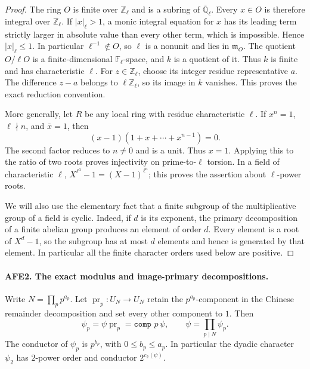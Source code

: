 \begin{proof}
The ring \(O\) is finite over \(\mathbb Z_\ell\) and is a
subring of \(\overline{\mathbb Q}_\ell\).
Every \(x\in O\) is therefore integral over \(\mathbb Z_\ell\).
If \(|x|_\ell>1\), a monic integral equation for \(x\) has
its leading term strictly larger in absolute value than
every other term, which is impossible.  Hence
\(|x|_\ell\le1\).  In particular \(\ell^{-1}\notin O\), so
\(\ell\) is a nonunit and lies in \(\mathfrak m_O\).
The quotient \(O/\ell O\) is a finite-dimensional
\(\mathbb F_\ell\)-space, and \(k\) is a quotient of it.
Thus \(k\) is finite and has characteristic \(\ell\).
For \(z\in\mathbb Z_\ell\), choose its integer residue
representative \(a\).  The difference \(z-a\) belongs to
\(\ell\mathbb Z_\ell\), so its image in \(k\) vanishes.
This proves the exact reduction convention.

More generally, let \(R\) be any local ring with residue
characteristic \(\ell\).  If \(x^n=1\), \(\ell\nmid n\),
and \(\bar x=1\), then
\[
 (x-1)(1+x+\cdots+x^{n-1})=0.
\]
The second factor reduces to \(n\ne0\) and is a unit.
Thus \(x=1\).  Applying this to the ratio of two roots
proves injectivity on prime-to-\(\ell\) torsion.
In a field of characteristic \(\ell\),
\(X^{\ell^a}-1=(X-1)^{\ell^a}\); this proves the
assertion about \(\ell\)-power roots.

We will also use the elementary fact that a finite subgroup
of the multiplicative group of a field is cyclic.  Indeed,
if \(d\) is its exponent, the primary decomposition of a
finite abelian group produces an element of order \(d\).
Every element is a root of \(X^d-1\), so the subgroup has
at most \(d\) elements and hence is generated by that
element.  In particular all the finite character orders
used below are positive.
\end{proof}

\paragraph{AFE2. The exact modulus and image-primary decompositions.}
\label{claim:AFE2}
Write \(N=\prod_p p^{a_p}\).
Let \(\operatorname{pr}_p:U_N\to U_N\) retain the
\(p^{a_p}\)-component in the Chinese remainder decomposition
and set every other component to \(1\).  Then
\[
 \psi_p=\psi\operatorname{pr}_p=\texttt{comp }p\,\psi,\qquad
 \psi=\prod_{p\mid N}\psi_p.                              \tag{AFE.2}
\]
The conductor of \(\psi_p\) is \(p^{b_p}\), with
\(0\le b_p\le a_p\).  In particular the dyadic character
\(\psi_2\) has \(2\)-power order and conductor
\(2^{c_2(\psi)}\).

